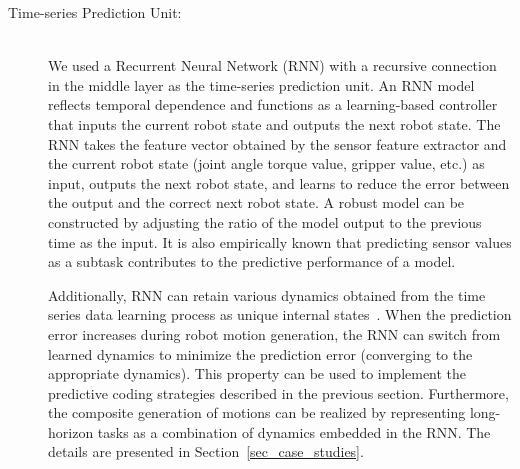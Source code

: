 \begin{description}
\item[Time-series Prediction Unit:]\mbox{}\\
We used a Recurrent Neural Network (RNN) with a recursive connection in the middle layer as the time-series prediction unit. An RNN model reflects temporal dependence and functions as a learning-based controller that inputs the current robot state and outputs the next robot state. The RNN takes the feature vector obtained by the sensor feature extractor and the current robot state (joint angle torque value, gripper value, etc.) as input, outputs the next robot state, and learns to reduce the error between the output and the correct next robot state. A robust model can be constructed by adjusting the ratio of the model output to the previous time as the input. It is also empirically known that predicting sensor values as a subtask contributes to the predictive performance of a model.


Additionally, RNN can retain various dynamics obtained from the time series data learning process as unique internal states~\cite{Tani1998}. When the prediction error increases during robot motion generation, the RNN can switch from learned dynamics to minimize the prediction error (converging to the appropriate dynamics). This property can be used to implement the predictive coding strategies described in the previous section. Furthermore, the composite generation of motions can be realized by representing long-horizon tasks as a combination of dynamics embedded in the RNN. The details are presented in Section~\ref{sec_case_studies}.
\end{description}


